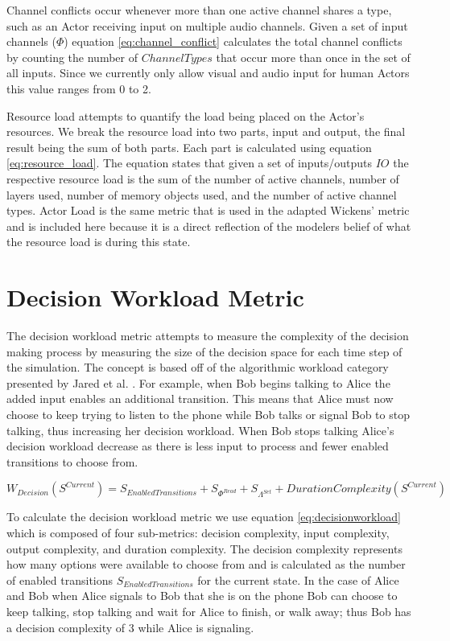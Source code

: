 Channel conflicts occur whenever more than one active channel shares a type, such as an Actor receiving input on multiple audio channels.  Given a set of input channels ($\Phi$) equation \ref{eq:channel_conflict} calculates the total channel conflicts by counting the number of $ChannelTypes$ that occur more than once in the set of all inputs.  Since we currently only allow visual and audio input for human Actors this value ranges from 0 to 2.  

Resource load attempts to quantify the load being placed on the Actor's resources.  We break the resource load into two parts, input and output, the final result being the sum of both parts.  Each part is calculated using equation \ref{eq:resource_load}.  The equation states that given a set of inputs/outputs $IO$ the respective resource load is the sum of the number of active channels, number of layers used, number of memory objects used, and the number of active channel types.  Actor Load is the same metric that is used in the adapted Wickens' metric and is included here because it is a direct reflection of the modelers belief of what the resource load is during this state.


\section{Decision Workload Metric}

The decision workload metric attempts to measure the complexity of the decision making process by measuring the size of the decision space for each time step of the simulation.  The concept is based off of the algorithmic workload category presented by Jared et al. \cite{moore2014modeling}.  For example, when Bob begins talking to Alice the added input enables an additional transition.  This means that Alice must now choose to keep trying to listen to the phone while Bob talks or signal Bob to stop talking, thus increasing her decision workload.  When Bob stops talking Alice's decision workload decrease as there is less input to process and fewer enabled transitions to choose from.

\begin{equation}
  W_{Decision}(S^{Current}) = S_{EnabledTransitions} + S_{\Phi^{Read}} + S_{\Lambda^{Set}} + DurationComplexity(S^{Current})
  \label{eq:decisionworkload}
\end{equation}

To calculate the decision workload metric we use equation \ref{eq:decisionworkload} which is composed of four sub-metrics: decision complexity, input complexity, output complexity, and duration complexity.  The decision complexity represents how many options were available to choose from and is calculated as the number of enabled transitions $S_{EnabledTransitions}$ for the current state.  In the case of Alice and Bob when Alice signals to Bob that she is on the phone Bob can choose to keep talking, stop talking and wait for Alice to finish, or walk away; thus Bob has a decision complexity of 3 while Alice is signaling.  

